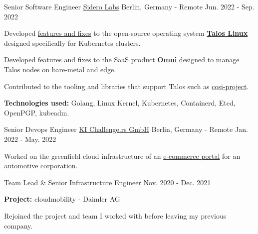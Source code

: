 
\begin{cventries}

    \cventry
    {Senior Software Engineer}
    {\href{https://www.siderolabs.com/}{Sidero Labs}}
    {Berlin, Germany - Remote}
    {Jun. 2022 - Sep. 2022}
    {
        \begin{cvitems}
            \item {
                Developed \href{https://github.com/siderolabs/talos/commits?author=utkuozdemir}{features and fixes}
                to the open-source operating system \href{https://github.com/siderolabs/talos}{\textbf{Talos Linux}} designed specifically for Kubernetes clusters.
            }
            \item {
                Developed features and fixes to the SaaS product
                \href{https://www.siderolabs.com/platform/saas-for-kubernetes}{\textbf{Omni}}
                designed to manage Talos nodes on bare-metal and edge.
            }
            \item Contributed to the tooling and libraries that support Talos such as \href{https://github.com/cosi-project}{cosi-project}.
            \item {
                \textbf{Technologies used:} Golang, Linux Kernel, Kubernetes, Containerd, Etcd, OpenPGP, kubeadm.
            }
        \end{cvitems}
    }

    \cventry
    {Senior Devops Engineer}
    {\href{https://ki-challengers.com}{KI Challenge.rs GmbH}}
    {Berlin, Germany - Remote}
    {Jan. 2022 - May. 2022}
    {
        \begin{cvitems}
            \item Worked on the greenfield cloud infrastructure of an \href{https://wtx.com}{e-commerce portal} for an automotive corporation.
        \end{cvitems}
    }

    \cventry
    {Team Lead \& Senior Infrastructure Engineer}
    {}
    {}
    {Nov. 2020 - Dec. 2021}
    {
        \begin{cvitems}
            \item {\textbf{Project:} cloudmobility - Daimler AG}
            \newline
            \item {Rejoined the project and team I worked with before leaving my previous company.}
        \end{cvitems}
    }


\end{cventries}
